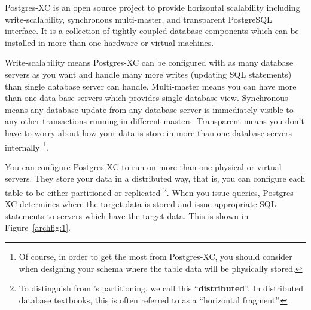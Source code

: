 %
%
%
%





  Postgres-XC is an open source project to provide horizontal scalability including
  write-scalability, synchronous multi-master, and transparent PostgreSQL interface.
  It is a collection of tightly coupled database components which can be installed
  in more than one hardware or virtual machines.

  Write-scalability means Postgres-XC can be configured with as many database servers
  as you want and handle many more writes (updating SQL statements) than single
  database server can handle.
  Multi-master means you can have more than one data base servers which provides
  single database view.
  Synchronous means any database update from any database server is immediately visible
  to any other transactions running in different masters.
  Transparent means you don't have to worry about how your data is store
  in more than one database servers internally%
  \footnote{Of course, in order to get the most from Postgres-XC,
	you should consider when designing your schema where the table
	data will be physically stored.
  }.

  You can configure Postgres-XC to run on more than one physical or virtual servers.
  They store your data in a distributed way, that is,
  you can configure each table to be either partitioned or replicated%
  \footnote{
	To distinguish from \PG's partitioning, we call this ``\textbf{distributed}''.
	In distributed database textbooks, this is often referred to as a ``horizontal fragment''.
  }.
  When you issue queries, Postgres-XC determines where the target data
  is stored and issue appropriate SQL statements to servers which have the target
  data.
  This is shown in Figure~\ref{archfig:1}.

